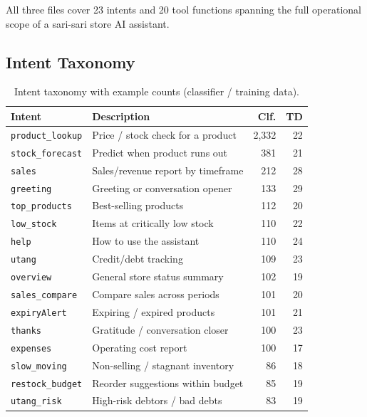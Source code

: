 \documentclass[11pt,a4paper]{article}
\begin{document}
All three files cover 23 intents and 20 tool functions spanning the full
operational scope of a sari-sari store AI assistant.

\subsection{Intent Taxonomy}

\begin{table}[h]
\centering
\caption{Intent taxonomy with example counts (classifier / training data).}
\label{tab:intents}
\small
\begin{tabular}{llrr}
\toprule
\textbf{Intent} & \textbf{Description} & \textbf{Clf.} & \textbf{TD} \\
\midrule
\texttt{product\_lookup}    & Price / stock check for a product   & 2{,}332 & 22 \\
\texttt{stock\_forecast}    & Predict when product runs out       & 381  & 21 \\
\texttt{sales}              & Sales/revenue report by timeframe   & 212  & 28 \\
\texttt{greeting}           & Greeting or conversation opener     & 133  & 29 \\
\texttt{top\_products}      & Best-selling products               & 112  & 20 \\
\texttt{low\_stock}         & Items at critically low stock       & 110  & 22 \\
\texttt{help}               & How to use the assistant            & 110  & 24 \\
\texttt{utang}              & Credit/debt tracking                & 109  & 23 \\
\texttt{overview}           & General store status summary        & 102  & 19 \\
\texttt{sales\_compare}     & Compare sales across periods        & 101  & 20 \\
\texttt{expiryAlert}        & Expiring / expired products         & 101  & 21 \\
\texttt{thanks}             & Gratitude / conversation closer     & 100  & 23 \\
\texttt{expenses}           & Operating cost report               & 100  & 17 \\
\texttt{slow\_moving}       & Non-selling / stagnant inventory    & 86   & 18 \\
\texttt{restock\_budget}    & Reorder suggestions within budget   & 85   & 19 \\
\texttt{utang\_risk}        & High-risk debtors / bad debts       & 83   & 19 \\

\end{tabular}
\end{table}
\end{document}
